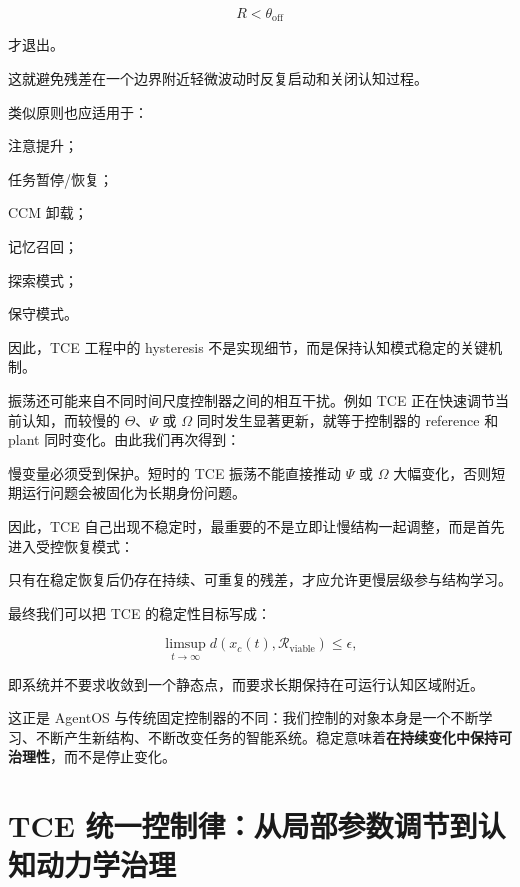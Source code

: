 \[
R<\theta_{\mathrm{off}}
\]

才退出。

这就避免残差在一个边界附近轻微波动时反复启动和关闭认知过程。

类似原则也应适用于：

注意提升；

任务暂停/恢复；

CCM 卸载；

记忆召回；

探索模式；

保守模式。

因此，TCE 工程中的 hysteresis 不是实现细节，而是保持认知模式稳定的关键机制。

振荡还可能来自不同时间尺度控制器之间的相互干扰。例如 TCE 正在快速调节当前认知，而较慢的 $\Theta$、$\Psi$ 或 $\Omega$ 同时发生显著更新，就等于控制器的 reference 和 plant 同时变化。由此我们再次得到：

\begin{statementbox}
\centering
{}
\end{statementbox}

慢变量必须受到保护。短时的 TCE 振荡不能直接推动 $\Psi$ 或 $\Omega$ 大幅变化，否则短期运行问题会被固化为长期身份问题。

因此，TCE 自己出现不稳定时，最重要的不是立即让慢结构一起调整，而是首先进入受控恢复模式：

\begin{statementbox}
\centering
{}
\end{statementbox}

只有在稳定恢复后仍存在持续、可重复的残差，才应允许更慢层级参与结构学习。

最终我们可以把 TCE 的稳定性目标写成：

\[
\boxed{
\limsup_{t\rightarrow\infty}
d
\left(
x_c(t),
\mathcal R_{\mathrm{viable}}
\right)
\le
\epsilon,
}
\]

即系统并不要求收敛到一个静态点，而要求长期保持在可运行认知区域附近。

这正是 AgentOS 与传统固定控制器的不同：我们控制的对象本身是一个不断学习、不断产生新结构、不断改变任务的智能系统。稳定意味着\textbf{在持续变化中保持可治理性}，而不是停止变化。

\section{TCE 统一控制律：从局部参数调节到认知动力学治理}

